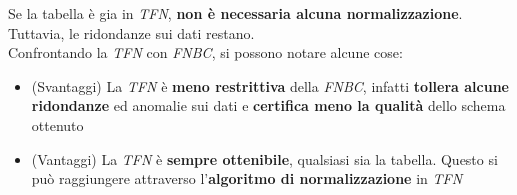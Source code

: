 \documentclass{article}
\begin{document}
Se la tabella è gia in \textit{TFN}, \textbf{non è necessaria alcuna normalizzazione}. Tuttavia, le ridondanze sui dati restano.\vspace{14pt}\\
Confrontando la \textit{TFN} con \textit{FNBC}, si possono notare alcune cose:
\begin{itemize}[label={-}, leftmargin=1cm]
    \itemsep0em
    \item (Svantaggi) La \textit{TFN} è \textbf{meno restrittiva} della \textit{FNBC}, infatti \textbf{tollera alcune ridondanze} ed anomalie sui dati e \textbf{certifica meno la qualità} dello schema ottenuto
    \item (Vantaggi) La \textit{TFN} è \textbf{sempre ottenibile}, qualsiasi sia la tabella. Questo si può raggiungere attraverso l'\textbf{algoritmo di normalizzazione} in \textit{TFN}
\end{itemize}
\end{document}

